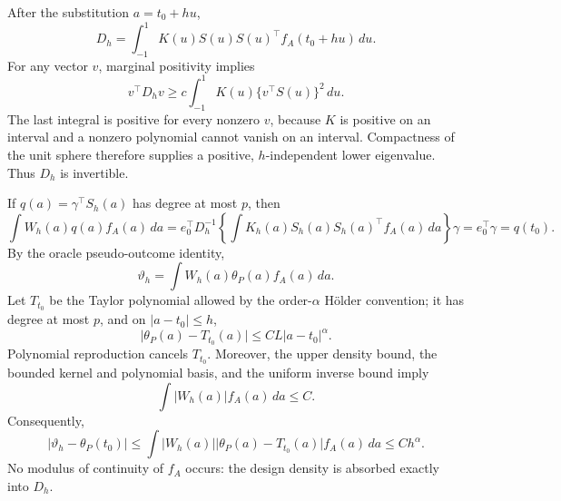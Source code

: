 After the substitution \(a=t_0+hu\),
\[
D_h=\int_{-1}^1K(u)S(u)S(u)^\top f_A(t_0+hu)\,du.
\]
For any vector \(v\), marginal positivity implies
\[
v^\top D_hv\ge c\int_{-1}^1K(u)\{v^\top S(u)\}^2\,du.
\]
The last integral is positive for every nonzero \(v\), because \(K\) is positive on an interval and a nonzero polynomial cannot vanish on an interval. Compactness of the unit sphere therefore supplies a positive, \(h\)-independent lower eigenvalue. Thus \(D_h\) is invertible.

If \(q(a)=\gamma^\top S_h(a)\) has degree at most \(p\), then
\[
\int W_h(a)q(a)f_A(a)\,da
=e_0^\top D_h^{-1}\left\{\int K_h(a)S_h(a)S_h(a)^\top f_A(a)\,da\right\}\gamma
=e_0^\top\gamma=q(t_0).
\]
By the oracle pseudo-outcome identity,
\[
\vartheta_h=\int W_h(a)\theta_P(a)f_A(a)\,da.
\]
Let \(T_{t_0}\) be the Taylor polynomial allowed by the order-\(\alpha\) Hölder convention; it has degree at most \(p\), and on \(\lvert a-t_0\rvert\le h\),
\[
\lvert\theta_P(a)-T_{t_0}(a)\rvert\le C L\lvert a-t_0\rvert^\alpha.
\]
Polynomial reproduction cancels \(T_{t_0}\). Moreover, the upper density bound, the bounded kernel and polynomial basis, and the uniform inverse bound imply
\[
\int\lvert W_h(a)\rvert f_A(a)\,da\le C.
\]
Consequently,
\[
\lvert\vartheta_h-\theta_P(t_0)\rvert
\le\int\lvert W_h(a)\rvert\lvert\theta_P(a)-T_{t_0}(a)\rvert f_A(a)\,da
\le C h^\alpha.
\]
No modulus of continuity of \(f_A\) occurs: the design density is absorbed exactly into \(D_h\).